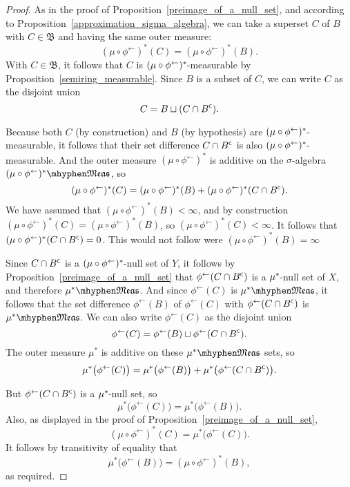 \documentclass[
twoside=true,
paper=letter,
fontsize=9pt,
pagesize=auto,
leqno,
openany,
headsepline,
overfullrule,
]{scrbook}
\theoremstyle{plain}
\theoremstyle{plain}
\theoremstyle{definition}
\theoremstyle{bfnoteitalic}
\theoremstyle{bfnoteroman}
\newcommand{\sigalg}[1]{\mathfrak{#1}}
\newcommand{\textsigma}{\hbox{\large{$\sigma$}}\kern-1pt}
\newcommand{\comp}{^{\hbox{\tiny{$\mathsf C$}}}}
\newcommand{\preimage}[1]{#1^{\leftarrow}}
\newcommand{\meets}{\cap}
\newcommand{\sigmaalgebraii}{\sigalg{B}}
\newcommand{\measurable}[1]{{#1}\mhyphen\mathfrak{Meas}}
\newcommand{\kernast}{\ast\kern-1pt}
\newcommand{\measurespace}{X}
\newcommand{\measurespaceii}{Y}
\newcommand{\measure}{\mu}
\begin{document}
\begin{proof}
As in the proof of Proposition~\ref{preimage_of_a_null_set}, and according to Proposition~\ref{approximation_sigma_algebra}, we can take a superset $C$ of $B$ with $C\in\sigmaalgebraii$ and having the same outer measure: 
\[
(\measure\circ\preimage{\phi})^*(C) =
(\measure\circ\preimage{\phi})^*(B).
\]
With $C\in\sigmaalgebraii$, it follows that $C$ is $(\measure\circ\preimage{\phi})^\kernast$-measurable by Proposition~\ref{semiring_measurable}.
Since $B$ is a subset of $C$, we can write $C$ as the disjoint union
\[
C=B\sqcup (C\meets B\comp).
\]

Because both $C$ (by construction) and $B$ (by hypothesis) are $(\measure\circ\preimage{\phi})^\kernast$-measurable, it follows that their set difference $C\meets B\comp$ is also $(\measure\circ\preimage{\phi})^\kernast$-measurable. And the outer measure 
$(\measure\circ\preimage{\phi})^*$ is additive on the \textsigma-algebra $\measurable{(\measure\circ\preimage{\phi})^*}$, so
\[
(\measure\circ\preimage{\phi})^*(C) =
(\measure\circ\preimage{\phi})^*(B) +
(\measure\circ\preimage{\phi})^*(C\meets B\comp).
\]
We have assumed that $(\measure\circ\preimage{\phi})^*(B) <\infty$, and by construction 
$(\measure\circ\preimage{\phi})^*(C) =
(\measure\circ\preimage{\phi})^*(B)$, so $(\measure\circ\preimage{\phi})^*(C) <\infty$.
It follows that 
$(\measure\circ\preimage{\phi})^*(C\meets B\comp) =0$. This would not follow were 
$(\measure\circ\preimage{\phi})^*(B) = \infty$

Since $C\meets B\comp$ is a $(\measure\circ\preimage{\phi})^\kernast$-null set of $\measurespaceii$, it follows by Proposition~\ref{preimage_of_a_null_set} that 
$\preimage{\phi}(C\meets B\comp)$ is a $\measure^\kernast$-null set of $\measurespace$, and therefore $\measurable{\measure^*}$. And since $\preimage{\phi}(C)$ is $\measurable{\measure^*}$, it follows that the set difference $\preimage{\phi}(B)$ of $\preimage{\phi}(C)$ with $\preimage{\phi}(C\meets B\comp)$ is $\measurable{\measure^*}$.
We can also write $\preimage{\phi}(C)$ as the disjoint union
\[
\preimage{\phi}(C) =
\preimage{\phi}(B) \sqcup \preimage{\phi}(C\meets B\comp).
\]
The outer measure $\measure^*$ is additive on these $\measurable{\measure^*}$ sets, so
\[
\measure^*\bigl(\preimage{\phi}(C)\bigr) = 
\measure^*\bigl(\preimage{\phi}(B)\bigr) +
\measure^*\bigl(\preimage{\phi}(C\meets B\comp)\bigr).
\]

But $\preimage{\phi}(C\meets B\comp)$ is a $\measure^\kernast$-null set, so 
\[
\measure^*\bigl(\preimage{\phi}(C)\bigr) = 
\measure^*\bigl(\preimage{\phi}(B)\bigr).
\]
Also, as displayed in the proof of Proposition~\ref{preimage_of_a_null_set},
\[
(\measure\circ\preimage{\phi})^*(C)
=
\measure^*\bigl(\preimage{\phi}(C)\bigr).
\] 
It follows by transitivity of equality that 
\[
\measure^*\bigl(\preimage{\phi}(B)\bigr) = (\measure\circ\preimage{\phi})^*(B),
\]
as required.
\end{proof}
\end{document}
